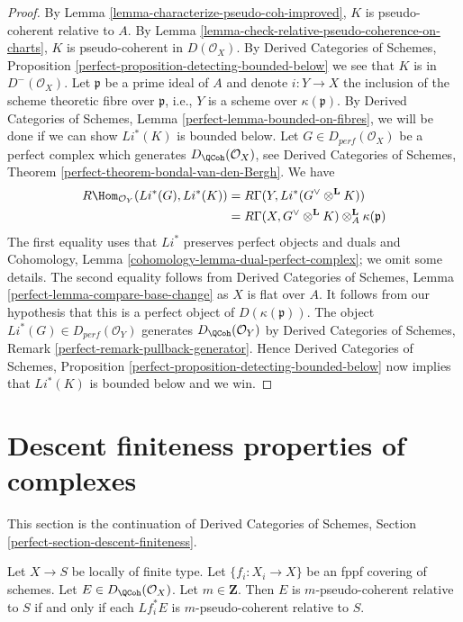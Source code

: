 \begin{proof}
By Lemma \ref{lemma-characterize-pseudo-coh-improved},
$K$ is pseudo-coherent relative to $A$. By Lemma
\ref{lemma-check-relative-pseudo-coherence-on-charts},
$K$ is pseudo-coherent in $D( \mathcal{O}_X)$.
By Derived Categories of Schemes, Proposition
\ref{perfect-proposition-detecting-bounded-below}
we see that $K$ is in $D^-(\mathcal{O}_X)$.
Let $\mathfrak{p}$ be a prime ideal of $A$ and denote
$i : Y \to X$ the inclusion of the scheme theoretic
fibre over $\mathfrak{p}$, i.e., $Y$ is a scheme over $\kappa(\mathfrak p)$.
By Derived Categories of Schemes, Lemma \ref{perfect-lemma-bounded-on-fibres},
we will be done if we can show  $Li^*(K)$ is bounded below. 
Let $G \in D_{perf} (\mathcal{O}_X)$ be a perfect
complex which generates $D_\QCoh (\mathcal{O}_X)$,
see Derived Categories of Schemes, Theorem
\ref{perfect-theorem-bondal-van-den-Bergh}.
We have
\begin{align*}
R\Hom _{\mathcal{O}_Y}(Li^*(G), Li^*(K))
& =
R\Gamma(Y, Li^*(G ^\vee \otimes ^\mathbf{L} K)) \\
& =
R\Gamma(X, G^\vee \otimes ^{\mathbf{L}} K)
\otimes^\mathbf{L}_A \kappa(\mathfrak{p})
\end{align*}
The first equality uses that $Li^*$ preserves perfect objects and duals
and Cohomology, Lemma \ref{cohomology-lemma-dual-perfect-complex}; we omit
some details. The second equality follows from
Derived Categories of Schemes, Lemma
\ref{perfect-lemma-compare-base-change}
as $X$ is flat over $A$. It follows from our hypothesis that this is a
perfect object of $D(\kappa(\mathfrak{p}))$. The object
$Li^*(G) \in D_{perf}(\mathcal{O}_Y)$  generates $D_\QCoh(\mathcal{O}_Y)$ by
Derived Categories of Schemes, Remark \ref{perfect-remark-pullback-generator}.
Hence Derived Categories of Schemes, Proposition
\ref{perfect-proposition-detecting-bounded-below}
now implies that $Li^*(K)$ is bounded below and we win.
\end{proof}




\section{Descent finiteness properties of complexes}
\label{section-descent-finiteness}

\noindent
This section is the continuation of Derived Categories of Schemes,
Section \ref{perfect-section-descent-finiteness}.

\begin{lemma}
\label{lemma-relative-pseudo-coherent-descends-fppf}
Let $X \to S$ be locally of finite type.
Let $\{f_i : X_i \to X\}$ be an fppf covering of schemes.
Let $E \in D_\QCoh(\mathcal{O}_X)$. Let $m \in \mathbf{Z}$.
Then $E$ is $m$-pseudo-coherent relative to $S$
if and only if each $Lf_i^*E$ is $m$-pseudo-coherent relative to $S$.
\end{lemma}

